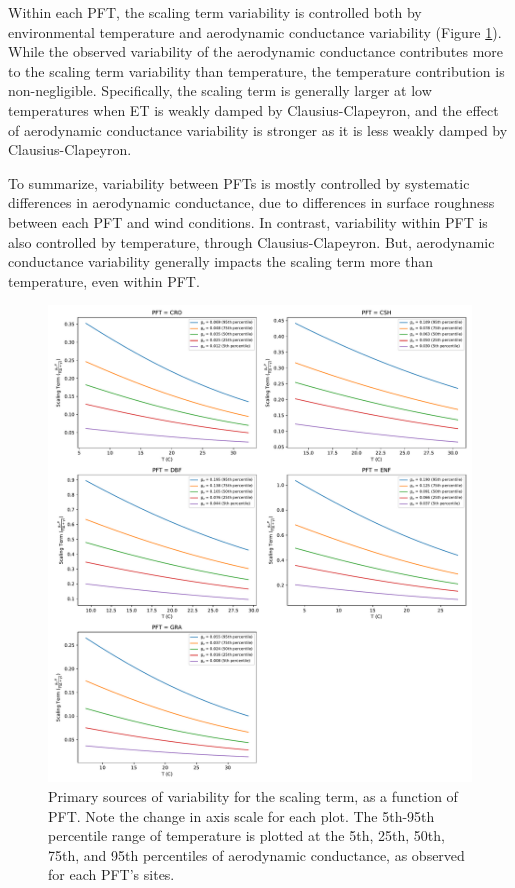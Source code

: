 \documentclass[draft,linenumbers]{gcbjournal}
\begin{document}
Within each PFT, the scaling term variability is controlled both by environmental temperature and aerodynamic conductance variability (Figure \ref{scale_vary}). While the observed variability of the aerodynamic conductance contributes more to the scaling term variability than temperature, the temperature contribution is non-negligible. Specifically, the scaling term is generally larger at low temperatures when ET is weakly damped by Clausius-Clapeyron, and the effect of aerodynamic conductance variability is stronger as it is less weakly damped by Clausius-Clapeyron.

To summarize, variability between PFTs is mostly controlled by systematic differences in aerodynamic conductance, due to differences in surface roughness between each PFT and wind conditions. In contrast, variability within PFT is also controlled by temperature, through Clausius-Clapeyron. But, aerodynamic conductance variability generally impacts the scaling term more than temperature, even within PFT.

\begin{figure}[!p]
\centering
\includegraphics[width=\textwidth]{./fig04b.pdf}
\caption{Primary sources of variability for the scaling term, as a function of PFT. Note the change in axis scale for each plot. The 5th-95th percentile range of temperature is plotted at the 5th, 25th, 50th, 75th, and 95th percentiles of aerodynamic conductance, as observed for each PFT's sites.}
\label{scale_vary}
\end{figure}
\end{document}
